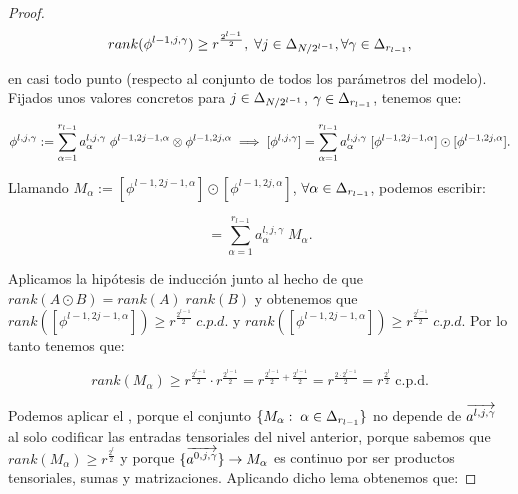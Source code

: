 \begin{proof}
    \begin{equation}
        rank(\phi^{l-1, j, \gamma}) \geq r^{\frac{2^{l - 1}}{2}},
        \; \forall j \in \Delta_{N/2^{l-1}}, \forall \gamma \in \Delta_{r_{l-1}},
    \end{equation}

    en casi todo punto (respecto al conjunto de todos los parámetros del modelo). Fijados unos valores concretos para $j \in \Delta_{N/2^{l-1}}$, $\gamma \in \Delta_{r_{l-1}}$, tenemos que:

    \begin{equation}
        \phi^{l, j, \gamma} := \sum_{\alpha = 1}^{r_{l-1}} a_{\alpha}^{l, j, \gamma} \; \phi^{l-1, 2j-1, \alpha} \otimes \phi^{l-1, 2j, \alpha} \implies [\phi^{l, j, \gamma}] = \sum_{\alpha = 1}^{r_{l-1}} a_{\alpha}^{l, j, \gamma} \; [\phi^{l-1, 2j-1, \alpha}] \odot [\phi^{l-1, 2j, \alpha}].
    \end{equation}

    Llamando $M_\alpha := [\phi^{l-1, 2j-1, \alpha}] \odot [\phi^{l-1, 2j, \alpha}]$, $\forall \alpha \in \Delta_{r_{l-1}}$, podemos escribir:

    \begin{equation}
        [\phi^{l, j, \gamma}] = \sum_{\alpha = 1}^{r_{l-1}} a_{\alpha}^{l, j, \gamma} \; M_\alpha.
    \end{equation}

    Aplicamos la hipótesis de inducción junto al hecho de que $rank(A \odot B) = rank(A) \; rank(B)$ y obtenemos que $rank([\phi^{l-1, 2j-1, \alpha}]) \geq r^{\frac{2^{l-1}}{2}} \; c.p.d.$ y $rank([\phi^{l-1, 2j-1, \alpha}]) \geq r^{\frac{2^{l-1}}{2}} \; c.p.d.$ Por lo tanto tenemos que:

    \begin{equation}
        rank(M_\alpha) \geq r^{\frac{2^{l-1}}{2}} \cdot r^{\frac{2^{l-1}}{2}} = r^{\frac{2^{l-1}}{2} + \frac{2^{l-1}}{2}} =
        r^{\frac{2 \cdot 2^{l - 1}}{2}} = r^{\frac{2^{l}}{2}} \; \text{c.p.d.}
    \end{equation}

    Podemos aplicar el , porque el conjunto $\{ M_\alpha: \; \alpha \in \Delta_{r_{l-1}} \}$ no depende de $\overrightarrow{a^{l, j, \gamma}}$ al solo codificar las entradas tensoriales del nivel anterior, porque sabemos que $rank(M_\alpha) \geq r^{\frac{2^l}{2}}$ y porque $\{ \overrightarrow{a^{0, j, \gamma}} \} \to M_\alpha$ es continuo por ser productos tensoriales, sumas y matrizaciones. Aplicando dicho lema obtenemos que:


\end{proof}
